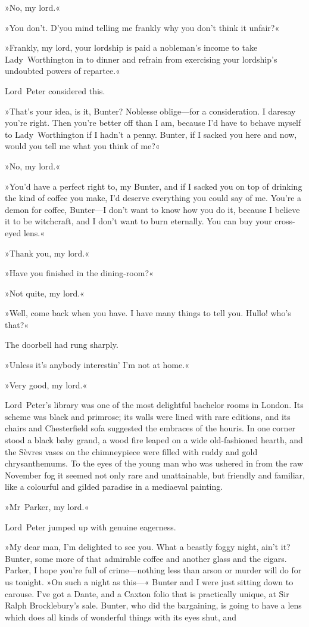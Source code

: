 »No, my lord.«

»You don't. D'you mind telling me frankly why you don't think it unfair?«

»Frankly, my lord, your lordship is paid a nobleman's income to take Lady~Worthington in to dinner and refrain from exercising your lordship's undoubted powers of repartee.«

Lord~Peter considered this.

»That's your idea, is it, Bunter? Noblesse oblige—for a consideration. I daresay you're right. Then you're better off than I am, because I'd have to behave myself to Lady~Worthington if I hadn't a penny. Bunter, if I sacked you here and now, would you tell me what you think of me?«

»No, my lord.«

»You'd have a perfect right to, my Bunter, and if I sacked you on top of drinking the kind of coffee you make, I'd deserve everything you could say of me. You're a demon for coffee, Bunter—I don't want to know how you do it, because I believe it to be witchcraft, and I don't want to burn eternally. You can buy your cross-eyed lens.«

»Thank you, my lord.«

»Have you finished in the dining-room?«

»Not quite, my lord.«

»Well, come back when you have. I have many things to tell you. Hullo! who's that?«

The doorbell had rung sharply.

»Unless it's anybody interestin' I'm not at home.«

»Very good, my lord.«

Lord~Peter's library was one of the most delightful bachelor rooms in London. Its scheme was black and primrose; its walls were lined with rare editions, and its chairs and Chesterfield sofa suggested the embraces of the houris. In one corner stood a black baby grand, a wood fire leaped on a wide old-fashioned hearth, and the Sèvres vases on the chimneypiece were filled with ruddy and gold chrysanthemums. To the eyes of the young man who was ushered in from the raw November fog it seemed not only rare and unattainable, but friendly and familiar, like a colourful and gilded paradise in a mediaeval painting.

»Mr~Parker, my lord.«

Lord~Peter jumped up with genuine eagerness.

»My dear man, I'm delighted to see you. What a beastly foggy night, ain't it? Bunter, some more of that admirable coffee and another glass and the cigars. Parker, I hope you're full of crime—nothing less than arson or murder will do for us tonight. »On such a night as this---« Bunter and I were just sitting down to carouse. I've got a Dante, and a Caxton folio that is practically unique, at Sir Ralph Brocklebury's sale. Bunter, who did the bargaining, is going to have a lens which does all kinds of wonderful things with its eyes shut, and

